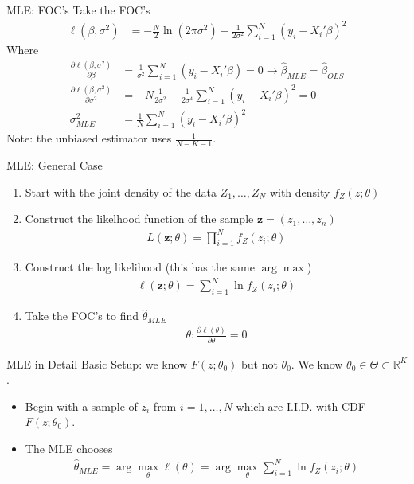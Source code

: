\documentclass[aspectratio=169]{beamer}
\begin{document}
\begin{frame}{MLE: FOC's}
Take the FOC's
\begin{align*}
\ell(\beta,\sigma^2) &= -\frac{N}{2} \ln (2 \pi \sigma^2) - \frac{1}{2 \sigma^2} \sum_{i=1}^N(y_i - X_i' \beta)^2
\end{align*}
Where 
\begin{align*} 
\frac{ \partial \ell(\beta,\sigma^2) }{\partial \beta}&= \frac{1}{ \sigma^2}\sum_{i=1}^N(y_i - X_i' \beta) = 0 \rightarrow \widehat{\beta}_{MLE}= \widehat{\beta}_{OLS}\\ 
\frac{ \partial \ell(\beta,\sigma^2) }{\partial \sigma^2}&= -N \frac{1}{2 \sigma^2}  -  \frac{1}{2 \sigma^4} \sum_{i=1}^N(y_i - X_i' \beta)^2 = 0 \\
\sigma^2_{MLE} &= \frac{1}{N} \sum_{i=1}^N (y_i - X_i' \beta)^2
\end{align*}
Note: the unbiased estimator uses $\frac{1}{N-K-1}$.
\end{frame}

\begin{frame}{MLE: General Case}
\begin{enumerate}
\item Start with the \alert{joint density of the data} $Z_1,\ldots,Z_N$ with density $f_Z(z ; \theta)$
\item Construct the likelhood function of the sample $\boldsymbol{z}=(z_1,\ldots,z_n)$
\begin{align*}
L(\boldsymbol{z} ; \theta) = \prod_{i=1}^N f_Z(z_i; \theta)
\end{align*}
\item Construct the \alert{log likelihood} (this has the same $\arg \max$)
\begin{align*}
\ell(\boldsymbol{z};  \theta) = \sum_{i=1}^N \ln f_Z(z_i; \theta)
\end{align*}
\item Take the FOC's to find $\widehat{\theta}_{MLE}$
\begin{align*}
\theta : \frac{\partial \ell(\theta)}{\partial \theta} =0
\end{align*}
\end{enumerate}
\end{frame}

\begin{frame}{MLE in Detail}
Basic Setup: we know $F(z ; \theta_0)$ but not $\theta_0$. We know $\theta_0 \in \Theta \subset \mathbb{R}^K$.
\begin{itemize}
\item Begin with a sample of $z_i$ from $i=1,\ldots,N$ which are I.I.D. with CDF $F(z ; \theta_0)$.
\item The MLE chooses
\begin{align*}
\widehat{\theta}_{MLE} = \arg \max_{\theta} \ell(\theta) = \arg \max_{\theta} \sum_{i=1}^N \ln f_Z(z_i; \theta)
\end{align*}
\end{itemize}
\end{frame}
\end{document}

